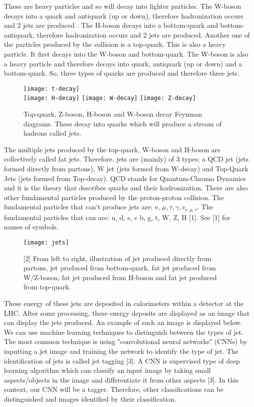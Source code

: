 \documentclass[11pt, a4page]{article}
\begin{document}
These are heavy particles and so will decay into lighter particles. The W-boson decays into a quark and antiquark (up or down), therefore hadronization occurs and 2 jets are produced . The H-boson decays into a bottom-quark and bottom-antiquark, therefore hadronization occurs and 2 jets are produced. 
Another one of the particles produced by the collision is a top-quark. This is also a heavy particle. It first decays into the W-boson and bottom-quark. The W-boson is also a heavy particle and therefore decays into quark, antiquark (up or down) and a bottom-quark.  So, three types of quarks are produced and therefore three jets. 
\begin{figure}[!ht]
    \centering
    \texttt{[image: t-decay]}\\
    \texttt{[image: H-decay]}
    \texttt{[image: W-decay]}
    \texttt{[image: Z-decay]}
    \caption{Top-quark, Z-boson, H-boson and W-boson decay Feynman diagrams. These decay into quarks which will produce a stream of hadrons called jets.}
    \label{nothing}
\end{figure}

The multiple jets produced by the top-quark, W-boson and H-boson are collectively called fat jets. Therefore, jets are (mainly) of 3 types; a QCD jet (jets formed directly from partons), W jet (jets formed from W-decay) and Top-Quark Jets (jets formed from Top-decay). QCD stands for Quantum-Chromo Dynamics and it is the theory that describes quarks and their hadronization. There are also other fundamental particles produced by the proton-proton collision. The fundamental particles that can't produce jets are: e, $\mu, \tau, \gamma, v_{e,\mu,\tau}$. The fundamental particles that can are: u, d, s, c b, g, t, W, Z, H [1]. See [1] for names of symbols. 

\begin{figure}[!ht]
    \centering
    \texttt{[image: jets]}
    \caption{[2] From left to right, illustration of jet produced directly from partons, jet produced from bottom-quark, fat jet produced from W/Z-boson, fat jet produced from H-boson and fat jet produced from top-quark.}
    \label{nothing}
\end{figure}
These energy of these jets are deposited in calorimeters within a detector at the LHC. After some processing, these energy deposits are displayed as an image that can display the jets produced. An example of such an image is displayed below. We can use machine learning techniques to distinguish between the types of jet. The most common technique is using "convolutional neural networks" (CNNs) by inputting a jet image and training the network to identify the type of jet. The identification of jets is called jet tagging [3]. A CNN is supervised type of deep learning algorithm which can classify an input image by taking small aspects/objects in the image and differentiate it from other aspects [3]. In this context, our CNN will be a tagger. Therefore, other classifications can be distinguished and images identified by their classification.\\
\end{document}
